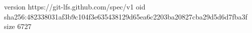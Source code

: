 version https://git-lfs.github.com/spec/v1
oid sha256:482338031af3b9c104f3e635438129d65ea6c2203ba20827cba29d5d6d7fba3f
size 6727

